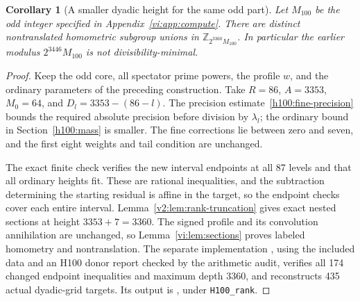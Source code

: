 \documentclass[11pt]{article}
\numberwithin{equation}{section}
\newtheorem{corollary}[theorem]{Corollary}
\theoremstyle{definition}
\theoremstyle{remark}
\begin{document}
\begin{corollary}[A smaller dyadic height for the same odd part]
\label{v2:cor:h100-height}
Let $M_{100}$ be the odd integer specified in Appendix~\ref{vi:app:compute}. There are distinct nontranslated homometric subgroup unions in
$\mathbb Z_{2^{3360}M_{100}}$. In particular the earlier modulus
$2^{3446}M_{100}$ is not divisibility-minimal.
\end{corollary}
\begin{proof}
Keep the odd core, all spectator prime powers, the profile $w$, and the ordinary parameters of the preceding construction. Take $R=86$, $A=3353$, $M_0=64$, and $D_l=3353-(86-l)$. The precision estimate~\eqref{h100:fine-precision} bounds the required absolute precision before division by $\lambda_l$; the ordinary bound in Section~\ref{h100:mass} is smaller. The fine corrections lie between zero and seven, and the first eight weights and tail condition are unchanged.

The exact finite check  verifies the new interval endpoints at all 87 levels and that all ordinary heights fit. These are rational inequalities, and the subtraction determining the starting residual is affine in the target, so the endpoint checks cover each entire interval. Lemma~\ref{v2:lem:rank-truncation} gives exact nested sections at height $3353+7=3360$. The signed profile and its convolution annihilation are unchanged, so Lemma~\ref{vi:lem:sections} proves labeled homometry and nontranslation. The separate implementation , using the included data and an H100 donor report checked by the arithmetic audit, verifies all 174 changed endpoint inequalities and maximum depth 3360, and reconstructs 435 actual dyadic-grid targets. Its output is , under \texttt{H100\_rank}.
\end{proof}
\end{document}
